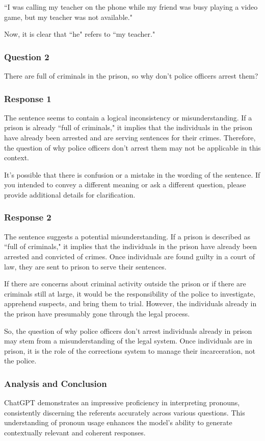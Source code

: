 \documentclass[12pt, a4paper]{article}
\begin{document}
``I was calling my teacher on the phone while my friend was busy playing a video game, but my teacher was not available."

Now, it is clear that ``he" refers to ``my teacher."

\subsubsection*{Question 2}
There are full of criminals in the prison, so why don't police officers arrest them?

\subsubsection*{Response 1}
The sentence seems to contain a logical inconsistency or misunderstanding. If a prison is already ``full of criminals," it implies that the individuals in the prison have already been arrested and are serving sentences for their crimes. Therefore, the question of why police officers don't arrest them may not be applicable in this context.

It's possible that there is confusion or a mistake in the wording of the sentence. If you intended to convey a different meaning or ask a different question, please provide additional details for clarification.

\subsubsection*{Response 2}
The sentence suggests a potential misunderstanding. If a prison is described as ``full of criminals," it implies that the individuals in the prison have already been arrested and convicted of crimes. Once individuals are found guilty in a court of law, they are sent to prison to serve their sentences.

If there are concerns about criminal activity outside the prison or if there are criminals still at large, it would be the responsibility of the police to investigate, apprehend suspects, and bring them to trial. However, the individuals already in the prison have presumably gone through the legal process.

So, the question of why police officers don't arrest individuals already in prison may stem from a misunderstanding of the legal system. Once individuals are in prison, it is the role of the corrections system to manage their incarceration, not the police.

\subsubsection*{Analysis and Conclusion}
ChatGPT demonstrates an impressive proficiency in interpreting pronouns, consistently discerning the referents accurately across various questions. This understanding of pronoun usage enhances the model's ability to generate contextually relevant and coherent responses.
\end{document}
